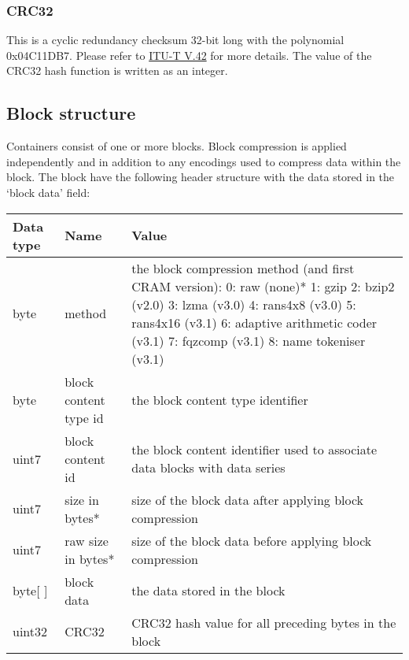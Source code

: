 \documentclass[a4paper]{article}
\begin{document}
\subsubsection*{CRC32}
This is a cyclic redundancy checksum 32-bit long with the polynomial 0x04C11DB7. Please refer to \href{http://www.itu.int/rec/recommendation.asp?type=folders&lang=e&parent=T-REC-V.42}{ITU-T V.42} for more details. The value of the CRC32 hash function is written as an integer.


\subsection{Block structure}
\label{sec:block-struct}

Containers consist of one or more blocks. Block compression is applied independently 
and in addition to any encodings used to compress data within the block. The block 
have the following header structure with the data stored in the `block data' field:

\begin{tabular}{|l|>{\raggedright}p{120pt}|>{\raggedright}p{260pt}|}
\hline
\textbf{Data type} & \textbf{Name} & \textbf{Value}
\tabularnewline
\hline
byte & method & the block compression method (and first CRAM version): \linebreak{}
0: raw (none)*\linebreak{}
1: gzip\linebreak{}
2: bzip2 (v2.0)\linebreak{}
3: lzma (v3.0)\linebreak{}
4: rans4x8 (v3.0)\linebreak{}
5: rans4x16 (v3.1)\linebreak{}
6: adaptive arithmetic coder (v3.1)\linebreak{}
7: fqzcomp (v3.1)\linebreak{}
8: name tokeniser (v3.1)
\tabularnewline
\hline
byte & block content type id & the block content type identifier\tabularnewline
\hline
uint7 & block content id & the block content identifier used to associate
data blocks with data series\tabularnewline
\hline
uint7 & size in bytes* & size of the block data after applying block compression\tabularnewline
\hline
uint7 & raw size in bytes* & size of the block data before applying block compression\tabularnewline
\hline
byte[ ] & block data & the data stored in the block\tabularnewline
\hline
uint32 & CRC32 & CRC32 hash value for all preceding bytes in the block\tabularnewline
\hline
\end{tabular}
\end{document}
